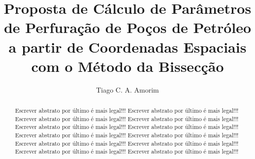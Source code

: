 \documentclass[final,3p,12pt]{elsarticle}
\begin{document}
\begin{frontmatter}



\title{Proposta de Cálculo de Parâmetros de Perfuração de Poços de Petróleo a partir de Coordenadas Espaciais com o Método da Bissecção}


\author{Tiago C. A. Amorim}

\begin{abstract}
    Escrever abstrato por último é mais legal!!! Escrever abstrato por último é mais legal!!! Escrever abstrato por último é mais legal!!! Escrever abstrato por último é mais legal!!! Escrever abstrato por último é mais legal!!! Escrever abstrato por último é mais legal!!! Escrever abstrato por último é mais legal!!! Escrever abstrato por último é mais legal!!! Escrever abstrato por último é mais legal!!! Escrever abstrato por último é mais legal!!! Escrever abstrato por último é mais legal!!! Escrever abstrato por último é mais legal!!!
    

\end{abstract}
\end{frontmatter}
\end{document}
